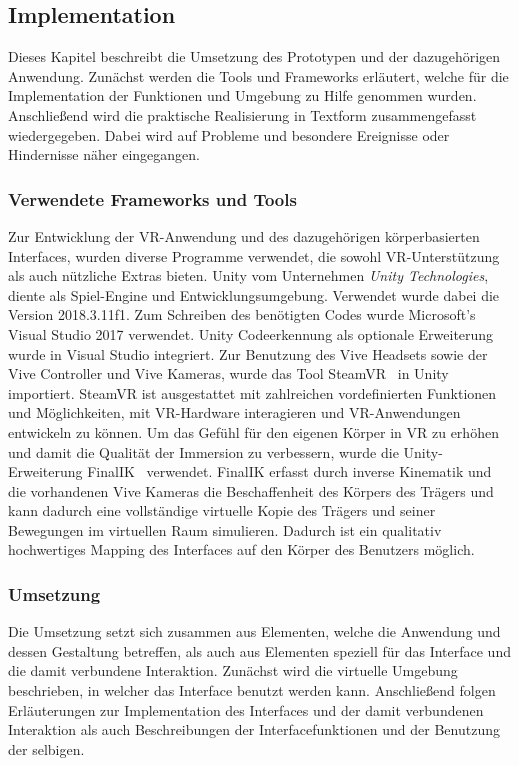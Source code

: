 \subsection{Implementation}
Dieses Kapitel beschreibt die Umsetzung des Prototypen und der dazugehörigen Anwendung. Zunächst werden die Tools und Frameworks erläutert, welche für die Implementation der Funktionen und Umgebung zu Hilfe genommen wurden. Anschließend wird die praktische Realisierung in Textform zusammengefasst wiedergegeben. Dabei wird auf Probleme und besondere Ereignisse oder Hindernisse näher eingegangen.

\subsubsection{Verwendete Frameworks und Tools}
Zur Entwicklung der VR-Anwendung und des dazugehörigen körperbasierten Interfaces, wurden diverse Programme verwendet, die sowohl VR-Unterstützung als auch nützliche Extras bieten. Unity vom Unternehmen \textit{Unity Technologies}, diente als Spiel-Engine und Entwicklungsumgebung. Verwendet wurde dabei die Version 2018.3.11f1. Zum Schreiben des benötigten Codes wurde Microsoft's Visual Studio 2017 verwendet. Unity Codeerkennung als optionale Erweiterung wurde in Visual Studio integriert. Zur Benutzung des Vive Headsets sowie der Vive Controller und Vive Kameras, wurde das Tool SteamVR~\citep{steamvr} in Unity importiert. SteamVR ist ausgestattet mit zahlreichen vordefinierten Funktionen und Möglichkeiten, mit VR-Hardware interagieren und VR-Anwendungen entwickeln zu können. Um das Gefühl für den eigenen Körper in VR zu erhöhen und damit die Qualität der Immersion zu verbessern, wurde die Unity-Erweiterung FinalIK~\citep{finalik} verwendet. FinalIK erfasst durch inverse Kinematik und die vorhandenen Vive Kameras die Beschaffenheit des Körpers des Trägers und kann dadurch eine vollständige virtuelle Kopie des Trägers und seiner Bewegungen im virtuellen Raum simulieren. Dadurch ist ein qualitativ hochwertiges Mapping des Interfaces auf den Körper des Benutzers möglich.

\subsubsection{Umsetzung}
Die Umsetzung setzt sich zusammen aus Elementen, welche die Anwendung und dessen Gestaltung betreffen, als auch aus Elementen speziell für das Interface und die damit verbundene Interaktion. Zunächst wird die virtuelle Umgebung beschrieben, in welcher das Interface benutzt werden kann. Anschließend folgen Erläuterungen zur Implementation des Interfaces und der damit verbundenen Interaktion als auch Beschreibungen der Interfacefunktionen und der Benutzung der selbigen.\\

